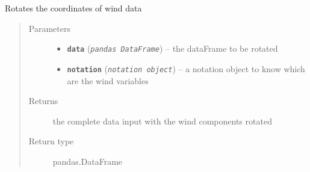 \documentclass[a4paper,10pt,oneside]{sphinxmanual}
\begin{document}

\begin{fulllineitems}
\label{pymicra:pymicra.data.rotate2D}
Rotates the coordinates of wind data
\begin{quote}\begin{description}
\item[{Parameters}] \leavevmode\begin{itemize}
\item {} 
\textbf{\texttt{data}} (\emph{\texttt{pandas DataFrame}}) -- the dataFrame to be rotated

\item {} 
\textbf{\texttt{notation}} (\emph{\texttt{notation object}}) -- a notation object to know which are the wind variables

\end{itemize}

\item[{Returns}] \leavevmode
the complete data input with the wind components rotated

\item[{Return type}] \leavevmode
pandas.DataFrame

\end{description}\end{quote}

\end{fulllineitems}

\end{document}
